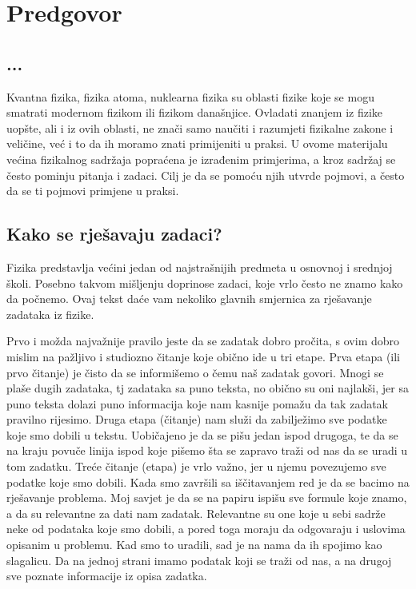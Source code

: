 \chapter*{Predgovor}


	\section*{ ... }
	Kvantna fizika, fizika atoma, nuklearna fizika su oblasti fizike koje se mogu smatrati modernom fizikom ili fizikom današnjice. 
	Ovladati znanjem iz fizike uopšte, ali i iz ovih oblasti, ne znači samo naučiti i razumjeti fizikalne zakone i veličine, već i to da ih moramo znati primijeniti u praksi. U ovome materijalu većina fizikalnog sadržaja popraćena je izrađenim primjerima, a kroz sadržaj se često pominju pitanja i zadaci. Cilj je da se pomoću njih utvrde pojmovi, a često da se ti pojmovi primjene u praksi.
	\section*{Kako se rješavaju zadaci?}
	Fizika predstavlja većini jedan od najstrašnijih predmeta u osnovnoj i srednjoj školi. Posebno takvom mišljenju doprinose zadaci, koje vrlo često ne znamo kako da počnemo. Ovaj tekst daće vam nekoliko glavnih smjernica za rješavanje zadataka iz fizike.
	
	Prvo i možda najvažnije pravilo jeste da se zadatak dobro pročita, s ovim dobro mislim na pažljivo i studiozno čitanje koje obično ide u tri etape. Prva etapa (ili prvo čitanje) je čisto da se informišemo  o čemu naš zadatak govori. Mnogi se plaše dugih zadataka, tj zadataka sa puno teksta, no obično su oni najlakši, jer sa puno teksta dolazi puno informacija koje nam kasnije pomažu da tak zadatak pravilno rijesimo.
	Druga etapa (čitanje) nam služi da zabilježimo sve podatke koje smo dobili u tekstu. Uobičajeno je  da se pišu jedan ispod drugoga, te da se na kraju povuče linija ispod koje pišemo šta se zapravo traži od nas da se uradi u tom zadatku. Treće čitanje (etapa) je vrlo važno, jer u njemu povezujemo sve podatke koje smo dobili.
	Kada smo završili sa iščitavanjem red je da se bacimo na rješavanje problema. Moj savjet je da se na papiru ispišu sve formule koje znamo, a da su relevantne za dati nam zadatak. Relevantne su one koje u sebi sadrže neke od podataka koje smo dobili, a pored toga moraju da odgovaraju i uslovima opisanim u problemu. Kad smo to uradili, sad je na nama da ih spojimo kao slagalicu. Da na jednoj strani imamo podatak koji se traži od nas, a na drugoj sve poznate informacije iz opisa zadatka.
	
